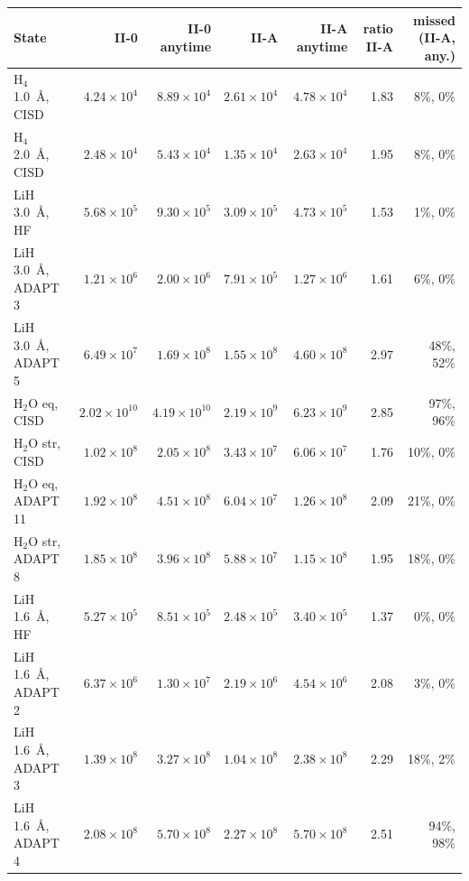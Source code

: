 \begin{tabular}{@{}lrrrrrr@{}}
\toprule
State & II-0 & II-0 anytime & II-A & II-A anytime & ratio II-A & missed (II-A, any.) \\
\midrule
H$_4$ 1.0~\AA, CISD & $4.24\times10^{4}$ & $8.89\times10^{4}$ & $2.61\times10^{4}$ & $4.78\times10^{4}$ & 1.83 & 8\%, 0\% \\
H$_4$ 2.0~\AA, CISD & $2.48\times10^{4}$ & $5.43\times10^{4}$ & $1.35\times10^{4}$ & $2.63\times10^{4}$ & 1.95 & 8\%, 0\% \\
LiH 3.0~\AA, HF & $5.68\times10^{5}$ & $9.30\times10^{5}$ & $3.09\times10^{5}$ & $4.73\times10^{5}$ & 1.53 & 1\%, 0\% \\
LiH 3.0~\AA, ADAPT 3 & $1.21\times10^{6}$ & $2.00\times10^{6}$ & $7.91\times10^{5}$ & $1.27\times10^{6}$ & 1.61 & 6\%, 0\% \\
LiH 3.0~\AA, ADAPT 5 & $6.49\times10^{7}$ & $1.69\times10^{8}$ & $1.55\times10^{8}$ & $4.60\times10^{8}$ & 2.97 & 48\%, 52\% \\
H$_2$O eq, CISD & $2.02\times10^{10}$ & $4.19\times10^{10}$ & $2.19\times10^{9}$ & $6.23\times10^{9}$ & 2.85 & 97\%, 96\% \\
H$_2$O str, CISD & $1.02\times10^{8}$ & $2.05\times10^{8}$ & $3.43\times10^{7}$ & $6.06\times10^{7}$ & 1.76 & 10\%, 0\% \\
H$_2$O eq, ADAPT 11 & $1.92\times10^{8}$ & $4.51\times10^{8}$ & $6.04\times10^{7}$ & $1.26\times10^{8}$ & 2.09 & 21\%, 0\% \\
H$_2$O str, ADAPT 8 & $1.85\times10^{8}$ & $3.96\times10^{8}$ & $5.88\times10^{7}$ & $1.15\times10^{8}$ & 1.95 & 18\%, 0\% \\
LiH 1.6~\AA, HF & $5.27\times10^{5}$ & $8.51\times10^{5}$ & $2.48\times10^{5}$ & $3.40\times10^{5}$ & 1.37 & 0\%, 0\% \\
LiH 1.6~\AA, ADAPT 2 & $6.37\times10^{6}$ & $1.30\times10^{7}$ & $2.19\times10^{6}$ & $4.54\times10^{6}$ & 2.08 & 3\%, 0\% \\
LiH 1.6~\AA, ADAPT 3 & $1.39\times10^{8}$ & $3.27\times10^{8}$ & $1.04\times10^{8}$ & $2.38\times10^{8}$ & 2.29 & 18\%, 2\% \\
LiH 1.6~\AA, ADAPT 4 & $2.08\times10^{8}$ & $5.70\times10^{8}$ & $2.27\times10^{8}$ & $5.70\times10^{8}$ & 2.51 & 94\%, 98\% \\
\bottomrule
\end{tabular}
